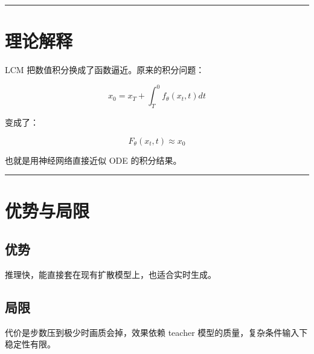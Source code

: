 \hrule

\section{理论解释}

LCM 把数值积分换成了函数逼近。原来的积分问题：

\[
x_0 = x_T + \int_T^0 f_\theta(x_t, t) dt
\]

变成了：

\[
F_\theta(x_t, t) \approx x_0
\]

也就是用神经网络直接近似 ODE 的积分结果。

\hrule

\section{优势与局限}

\subsection{优势}

推理快，能直接套在现有扩散模型上，也适合实时生成。

\subsection{局限}

代价是步数压到极少时画质会掉，效果依赖 teacher 模型的质量，复杂条件输入下稳定性有限。
